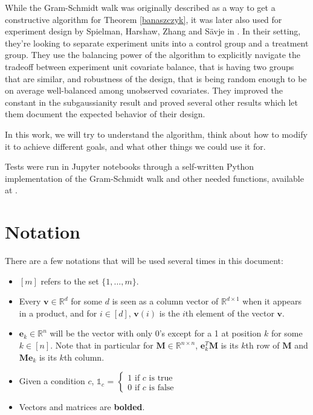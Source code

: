 \documentclass[12pt]{article}
\begin{document}
While the Gram-Schmidt walk was originally described as a way to get a constructive algorithm for Theorem \ref{banaszczyk}, it was later also used for experiment design by Spielman, Harshaw, Zhang and Sävje in \cite{harshaw2019balancing}. In their setting, they're looking to separate experiment units into a control group and a treatment group.  They use the balancing power of the algorithm to explicitly navigate the tradeoff between experiment unit covariate balance, that is having two groups that are similar, and robustness of the design, that is being random enough to be on average well-balanced among unobserved covariates. They improved the constant in the subgaussianity result and proved several other results which let them document the expected behavior of their design.

In this work, we will try to understand the algorithm, think about how to modify it to achieve different goals, and what other things we could use it for.

Tests were run in Jupyter notebooks through a self-written Python implementation of the Gram-Schmidt walk and other needed functions, available at \cite{github}.

\section{Notation}
There are a few notations that will be used several times in this document:
\begin{itemize}
\item $[m]$ refers to the set $\{1,\dots,m\}$.
\item Every $\textbf{v}\in\mathbb{R}^d$ for some $d$ is seen as a column vector of $\mathbb{R}^{d\times 1}$ when it appears in a product, and for $i\in[d]$, $\textbf{v}(i)$ is the $i$th element of the vector $\textbf{v}$.
\item $\textbf{e}_k\in\mathbb{R}^{n}$ will be the vector with only 0's except for a 1 at position $k$ for some $k\in[n]$. Note that in particular for $\textbf{M}\in\mathbb{R}^{n\times n}$, $\textbf{e}_k^T\textbf{M}$ is its $k$th row of $\textbf{M}$ and $\textbf{Me}_k$ is its $k$th column.
\item Given a condition $c$, $\mathds{1}_{c}$ = $\begin{cases}
            1 \textrm{ if }c\textrm{ is true}\\
            0 \textrm{ if }c\textrm{ is false}
        \end{cases}$
\item Vectors and matrices are \textbf{bolded}.
\end{itemize}
\end{document}
